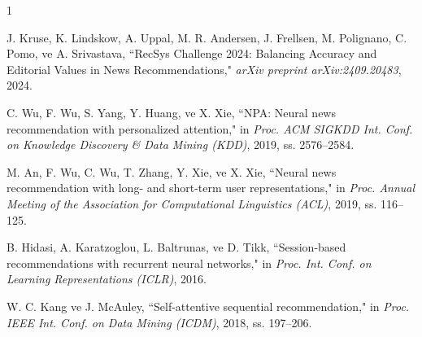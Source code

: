 \documentclass[conference]{IEEEtran}
\begin{document}
%
%
%
\begin{thebibliography}{1}


J. Kruse, K. Lindskow, A. Uppal, M. R. Andersen, J. Frellsen, M. Polignano, C. Pomo, ve A. Srivastava, ``RecSys Challenge 2024: Balancing Accuracy and Editorial Values in News Recommendations," \emph{arXiv preprint arXiv:2409.20483}, 2024.

C. Wu, F. Wu, S. Yang, Y. Huang, ve X. Xie, ``NPA: Neural news recommendation with personalized attention," in \emph{Proc. ACM SIGKDD Int. Conf. on Knowledge Discovery \& Data Mining (KDD)}, 2019, ss. 2576--2584.

M. An, F. Wu, C. Wu, T. Zhang, Y. Xie, ve X. Xie, ``Neural news recommendation with long- and short-term user representations," in \emph{Proc. Annual Meeting of the Association for Computational Linguistics (ACL)}, 2019, ss. 116--125.

B. Hidasi, A. Karatzoglou, L. Baltrunas, ve D. Tikk, ``Session-based recommendations with recurrent neural networks," in \emph{Proc. Int. Conf. on Learning Representations (ICLR)}, 2016.

W. C. Kang ve J. McAuley, ``Self-attentive sequential recommendation," in \emph{Proc. IEEE Int. Conf. on Data Mining (ICDM)}, 2018, ss. 197--206.



\end{thebibliography}




\end{document}
